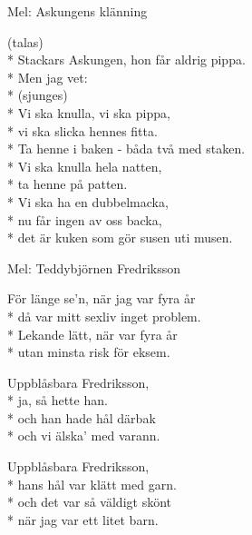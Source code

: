 \begin{SongText}
    \begin{SongInfo}
        Mel: Askungens klänning
    \end{SongInfo}
    \begin{SongVerse}
        (talas)\\*%
        Stackars Askungen, hon får aldrig pippa.\\*%
        Men jag vet:\\*%
        (sjunges)\\*%
        Vi ska knulla, vi ska pippa,\\*%
        vi ska slicka hennes fitta.\\*%
        Ta henne i baken - båda två med staken.\\*%
        Vi ska knulla hela natten,\\*%
        ta henne på patten.\\*%
        Vi ska ha en dubbelmacka,\\*%
        nu får ingen av oss backa,\\*%
        det är kuken som gör susen uti musen.
    \end{SongVerse}
\end{SongText}
\begin{SongText}
    \begin{SongInfo}
        Mel: Teddybjörnen Fredriksson
    \end{SongInfo}
    \begin{SongVerse}
        För länge se’n, när jag var fyra år\\*%
        då var mitt sexliv inget problem.\\*%
        Lekande lätt, när var fyra år\\*%
        utan minsta risk för eksem.
    \end{SongVerse}
    \begin{SongVerse}
        Uppblåsbara Fredriksson,\\*%
        ja, så hette han.\\*%
        och han hade hål därbak\\*%
        och vi älska’ med varann.
    \end{SongVerse}
    \begin{SongVerse}
        Uppblåsbara Fredriksson,\\*%
        hans hål var klätt med garn.\\*%
        och det var så väldigt skönt\\*%
        när jag var ett litet barn.
    \end{SongVerse}
\end{SongText}
